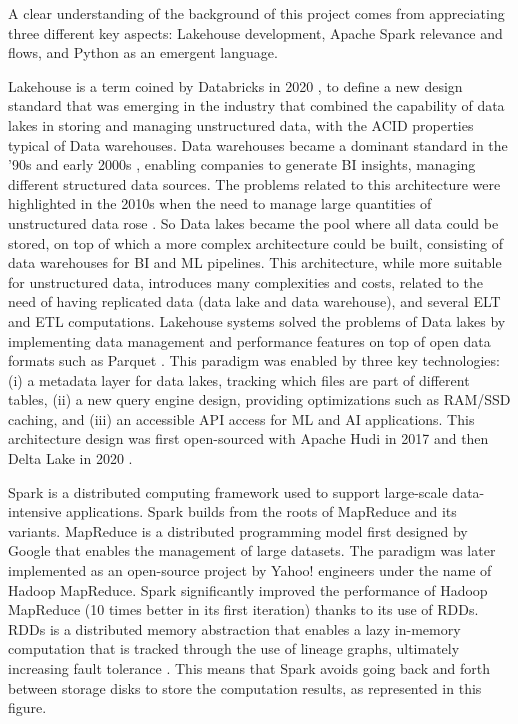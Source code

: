 A clear understanding of the background of this project comes from appreciating three different key aspects: Lakehouse development, Apache Spark relevance and flows, and Python as an emergent language.

Lakehouse is a term coined by Databricks in 2020 \cite{WhatLakehouse2020}, to define a new design standard that was emerging in the industry that combined the capability of data lakes in storing and managing unstructured data, with the \gls{ACID} properties typical of Data warehouses.
Data warehouses became a dominant standard in the '90s and early 2000s \cite{chaudhuriOverviewDataWarehousing1997}, enabling companies to generate \gls{BI} insights, managing different structured data sources. The problems related to this architecture were highlighted in the 2010s when the need to manage large quantities of unstructured data rose \cite{ederUnstructuredData802008}. 
So Data lakes became the pool where all data could be stored, on top of which a more complex architecture could be built, consisting of data warehouses for \gls{BI} and \gls{ML} pipelines.
This architecture, while more suitable for unstructured data, introduces many complexities and costs, related to the need of having replicated data (data lake and data warehouse), and several \gls{ELT} and \gls{ETL} computations.
Lakehouse systems solved the problems of Data lakes by implementing data management and performance features on top of open data formats such as Parquet \cite{DremelMadeSimple}. This paradigm was enabled by three key technologies: (i) a metadata layer for data lakes, tracking which files are part of different tables, (ii) a new query engine design, providing optimizations such as RAM/SSD caching, and (iii) an accessible \gls{API} access for \gls{ML} and \gls{AI} applications. This architecture design was first open-sourced with Apache Hudi in 2017 \cite{rajaperumalUberEngineeringIncremental2017} and then Delta Lake in 2020 \cite{armbrustDeltaLakeHighperformance2020}.

Spark is a distributed computing framework used to support large-scale data-intensive applications. Spark builds from the roots of MapReduce and its variants. MapReduce is a distributed programming model first designed by Google that enables the management of large datasets. The paradigm was later implemented as an open-source project by Yahoo! engineers under the name of Hadoop MapReduce. Spark significantly improved the performance of Hadoop MapReduce (10 times better in its first iteration) thanks to its use of \glspl{RDD}. \glspl{RDD} is a distributed memory abstraction that enables a lazy in-memory computation that is tracked through the use of lineage graphs, ultimately increasing fault tolerance \cite{Zaharia:EECS-2011-82}. This means that Spark avoids going back and forth between storage disks to store the computation results, as represented in this figure.
 
